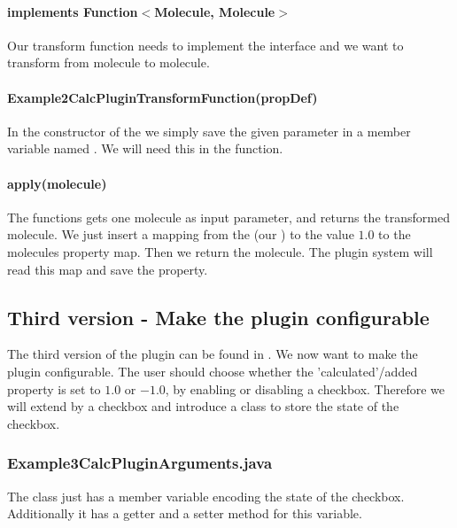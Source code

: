     \paragraph{implements Function$<$Molecule, Molecule$>$}
    Our transform function needs to implement the  interface
    and we want to transform from molecule to molecule.

    \paragraph{Example2CalcPluginTransformFunction(propDef)}
    In the constructor of the  we simply save the given
     parameter in a member variable named .
    We will need this in the  function.

    \paragraph{apply(molecule)}
    The  functions gets one molecule as input parameter, and returns the transformed molecule.
    We just insert a mapping from the  (our ) to the value $1.0$ to the molecules property map.
    Then we return the molecule. The plugin system will read this map and save the property.

\subsection{Third version - Make the plugin configurable}
The third version of the plugin can be found in
.
We now want to make the plugin configurable.
The user should choose whether the 'calculated'/added property is set to $1.0$ or $-1.0$, by enabling or disabling a checkbox.
Therefore we will extend  by a checkbox
and introduce a  class to store the state of the checkbox.
  
  \subsubsection{Example3CalcPluginArguments.java}
  The  class just has a
   member variable encoding the state of the checkbox.
  Additionally it has a getter and a setter method for this variable.

